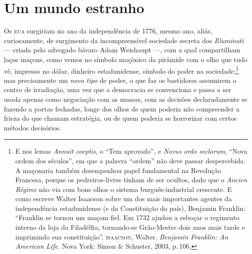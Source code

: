 \section{Um mundo estranho}

Os \textsc{eua} surgiriam no ano da independência de 1776, mesmo ano, aliás,
curiosamente, de surgimento da incompreensível sociedade secreta dos
\emph{Illuminati} --- criada pelo advogado bávaro Adam Weishaupt ---, com a qual compartilham laços maçons, como vemos no símbolo maçônico da pirâmide com o olho que tudo vê, impresso no dólar, dinheiro estadunidense, símbolo do poder na
sociedade;\footnote{E nos
  lemas \emph{Annuit coeptis}, o ``Tem aprovado'', e \emph{Novus ordo
  seclorum}, ``Nova ordem dos séculos'', em que a palavra ``ordem'' não
  deve passar despercebida. A maçonaria também desempenhou papel
  fundamental na Revolução Francesa, porque os pedreiros-livres tinham
  de ser ocultos, dado que o \emph{Ancien Régime} não via com bons olhos
  o sistema burguês-industrial crescente. E como escreve Walter Isaacson
  sobre um dos mais importantes agentes da independência estadunidense
  (e da Constituição do país), Benjamin Franklin: ``Franklin se tornou
  um maçom fiel. Em 1732 ajudou a esboçar o regimento interno da loja da
  Filadélfia, tornando-se Grão-Mestre dois anos mais tarde e imprimindo
  sua constituição''. \textsc{isaacson}, Walter. \emph{Benjamin
  Franklin: An American Life}. Nova York: Simon \& Schuster, 2003, p.\,106.}
 mas precisamente um \emph{novo tipo} de poder, o que faz os
bastidores assumirem o centro de irradiação, uma vez que a democracia se
convenciona e passa a ser usada apenas como negociação com as massas,
com as decisões declaradamente se fazendo a portas fechadas, longe dos
olhos de quem poderia não compreender a frieza do que chamam estratégia,
ou de quem poderia se horrorizar com certos métodos decisórios.

